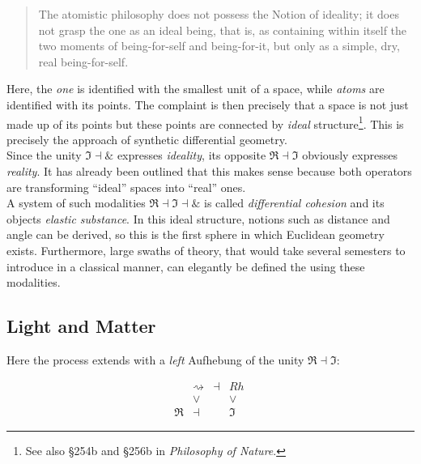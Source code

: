\documentclass{article}
\begin{document}
\begin{quote}
    The atomistic philosophy does not possess the Notion of ideality; it does not grasp the one as an ideal being, that is, as containing within itself the two moments of being-for-self and being-for-it, but only as a simple, dry, real being-for-self.
\end{quote}

Here, the \emph{one} is identified with the smallest unit of a space, while \emph{atoms} are identified with its points. The complaint is then precisely that a space is not just made up of its points but these points are connected by \emph{ideal} structure\footnote{See also §254b and §256b in \emph{Philosophy of Nature}.}. This is precisely the approach of synthetic differential geometry. \\

Since the unity $\Im\dashv\&$ expresses \emph{ideality}, its opposite $\Re\dashv\Im$ obviously expresses \emph{reality}. It has already been outlined that this makes sense because both operators are transforming ``ideal'' spaces into ``real'' ones. \\

A system of such modalities $\Re\dashv\Im\dashv\&$ is called \emph{differential cohesion} and its objects \emph{elastic substance}. In this ideal structure, notions such as distance and angle can be derived, so this is the first sphere in which Euclidean geometry exists. Furthermore, large swaths of theory, that would take several semesters to introduce in a classical manner, can elegantly be defined the using these modalities.



\subsection{Light and Matter}
Here the process extends with a \emph{left} Aufhebung of the unity $\Re\dashv\Im$: 


$$
  \begin{array}{cccc}
     & \rightsquigarrow & \dashv & Rh
    \\
     & \vee & & \vee
    \\
    \Re & \dashv & & \Im
    \end{array}
  \ 
$$
\end{document}
